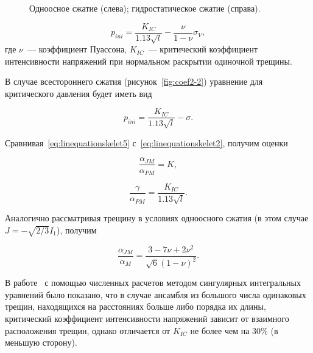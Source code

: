 \begin{figure}[ht]
    \caption[Одноосное сжатие (слева); гидростатическое сжатие (справа).]{Одноосное сжатие (слева); гидростатическое сжатие (справа).}\label{fig:coef2}
\end{figure}

\begin{equation}
  \label{eq:omegaeq1}
  p_{ini} = \frac{K_{IC}}{1.13 \sqrt{l}} - \frac{\nu}{1 - \nu }\sigma_V,
\end{equation}
где $\nu$~--- коэффициент Пуассона, $K_{IC}$~--- критический коэффициент интенсивности напряжений при нормальном раскрытии одиночной трещины.

В случае всестороннего сжатия (рисунок~\ref{fig:coef2-2}) уравнение для критического давления будет иметь вид

\begin{equation}
  \label{eq:omegaeq2}
  p_{ini} = \frac{K_{IC}}{1.13 \sqrt{l}} - \sigma.
\end{equation}

Сравнивая~\eqref{eq:linequationskelet5} с~\eqref{eq:linequationskelet2}, получим оценки

\begin{equation}
  \label{eq:omegaeq3}
  \frac{\alpha_{JM}}{\alpha_{PM}} = K,
\end{equation}

\begin{equation}
  \label{eq:omegaeq4}
  \frac{\gamma}{\alpha_{PM}} = \frac{K_{IC}}{1.13 \sqrt{l}}.
\end{equation}

Аналогично рассматривая трещину в условиях одноосного сжатия (в этом случае $J = -\sqrt{2/3}I_1$), получим

\begin{equation}
  \label{eq:omegaeq4}
  \frac{\alpha_{JM}}{\alpha_{M}} = \frac{3 - 7 \nu +2 \nu^2}{\sqrt{6}(1-\nu)^2}.
\end{equation}

В работе~\autocite{grytsenko2010numerical} с помощью численных расчетов методом сингулярных интегральных уравнений было показано, что в случае ансамбля из большого числа одинаковых трещин, находящихся на расстояниях больше либо порядка их длины, критический коэффициент интенсивности напряжений зависит от взаимного расположения трещин, однако отличается от $K_{IC}$ не более чем на $30\%$ (в меньшую сторону).

